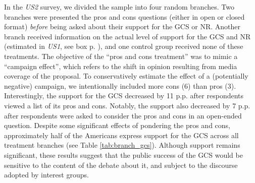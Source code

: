 In the \textit{US2} survey, we divided the sample into four random branches. Two branches were presented the pros and cons questions (either in open or closed format) \textit{before} being asked about their support for the GCS or NR. Another branch received information on the actual level of support for the GCS and NR (estimated in \textit{US1}, see box p. \pageref{subsec:second_order_beliefs}), %
and one control group received none of these treatments. %
The objective of the ``pros and cons treatment'' was to mimic a ``campaign effect'', which refers to the shift in opinion resulting from media coverage of the proposal. To conservatively estimate the effect of a (potentially negative) campaign, we intentionally included more cons (6) than pros (3). Interestingly, the support for the GCS decreased by 11 p.p. after respondents viewed a list of its pros and cons. %
Notably, the support also decreased by 7 p.p. after respondents were asked to consider the pros and cons in an open-ended question. Despite some significant effects of pondering the pros and cons, approximately half of the Americans express support for the GCS across all treatment branches (see Table \ref{tab:branch_gcs}). Although support remains significant, %
these results suggest that the public success of the GCS would be sensitive to the content of the debate about it, and subject to the discourse adopted by interest groups. %






